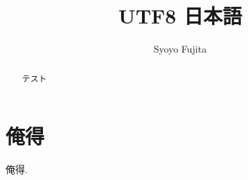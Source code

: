 \documentclass[a4j]{jarticle}
\title{UTF8 日本語}
\author{Syoyo Fujita}
\begin{document}
\maketitle

\begin{abstract}
テスト
\end{abstract}

\section{俺得}

俺得.
\end{document}
